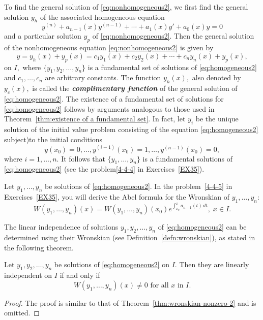 To find the general solution of \eqref{eq:nonhomogeneous2}, we first find the general solution $y_h$ of the associated homogeneous equation
	\begin{equation} \label{eq:homogeneous2}
	y^{(n)} + a_{n-1}(x)y^{(n-1)} + \cdots + a_1(x)y' + a_0(x)y = 0
\end{equation}
and a particular solution $y_p$ of \eqref{eq:nonhomogeneous2}. 
	Then the general solution  of the nonhomogeneous equation \eqref{eq:nonhomogeneous2} is given by
\begin{equation} \label{eq:general-solution}
	\boxed{	y = y_h(x)+y_p(x)
		= c_1 y_1(x) + c_2 y_2(x) + \cdots + c_n y_n(x) + y_p(x),}
\end{equation}
on $I,$ where   \( \{y_1, y_2, \dots, y_n\} \) is   a fundamental set of solutions of \eqref{eq:homogeneous2} and $c_1, \dots, c_n$ are arbitrary constants. The function $y_h(x),$  also denoted by $y_c(x),$ is  called the \textbf{\textit{complimentary function}} of the general solution of \eqref{eq:homogeneous2}. The existence of a fundamental set of solutions for \eqref{eq:homogeneous2} follows by arguments analogous to those used in Theorem~\ref{thm:existence of a fundamental set}.
In fact, let $y_i$ be  the  unique solution  of the initial value problem consisting of the equation \eqref{eq:homogeneous2} subject)to the initial conditions 
\begin{equation}\label{eq:initial-conditions}
	y(x_0) =0, \dots, y^{(i-1)}(x_0) =1, \dots, y^{(n-1)}(x_0) =0,
\end{equation}
where $i = 1, \dots, n.$ 
It follows that \(\{y_1, \dots, y_n\}\) is a fundamental solutions of \eqref{eq:homogeneous2} (see the problem\ref{4-4-4} in Exercises~\ref{EX35}).


Let \( y_1, \dots,  y_n \) be solutions of \eqref{eq:homogeneous2}.  In the problem~\ref{4-4-5} in Exercises~\ref{EX35}, you will derive
the Abel formula for the Wronskian of $y_1, \dots, y_n$: 
\[W(y_1, \dots, y_n) (x)= W(y_1, \dots, y_n)(x_0) e^{\int_{x_0}^x a_{n-1}(t)\, dt}, \; x\in I.\]

The linear independence of solutions \(y_1, y_2, \dots, y_n\)  of \ref{eq:homogeneous2} can be determined using their Wronskian (see Definition~\ref{defn:wronskian}), as stated in the following theorem.

\begin{theorem}\label{thm:wronskian-nonzero-3}
	Let \( y_1, y_2, \dots, y_n \) be solutions  of \eqref{eq:homogeneous2} on $I.$
	 Then they are linearly independent on $I$ if and only if 
	 \[W(y_1, \dots, y_n)(x)\ne 0 \mbox{ for all } x \mbox{ in } I.\]
\end{theorem}
\begin{proof}
	The proof is similar to that of Theorem~\ref{thm:wronskian-nonzero-2} and is omitted.
\end{proof}



